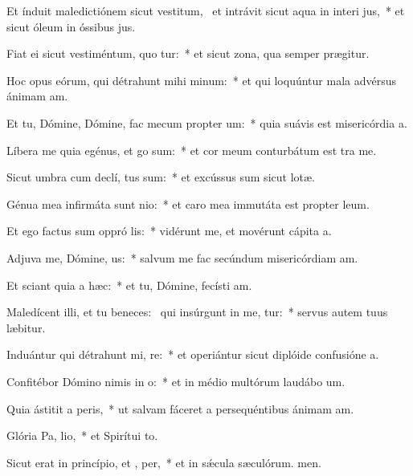 \item Et índuit maledictiónem sicut vestitum,~\pscross{} et intrávit sicut aqua in interi jus,~* et sicut óleum in óssibus jus.
\item Fiat ei sicut vestiméntum, quo tur:~* et sicut zona, qua semper prægitur.
\item Hoc opus eórum, qui détrahunt mihi  minum:~* et qui loquúntur mala advérsus ánimam am.
\item Et tu, Dómine, Dómine, fac mecum propter  um:~* quia suávis est misericórdia a.
\item Líbera me quia egénus, et  go sum:~* et cor meum conturbátum est tra me.
\item Sicut umbra cum declí, tus sum:~* et excússus sum sicut lotæ.
\item Génua mea infirmáta sunt  nio:~* et caro mea immutáta est propter leum.
\item Et ego factus sum oppró lis:~* vidérunt me, et movérunt cápita a.
\item Adjuva me, Dómine,  us:~* salvum me fac secúndum misericórdiam am.
\item Et sciant quia  a hæc:~* et tu, Dómine, fecísti am.
\item Maledícent illi, et tu beneces:~\pscross{} qui insúrgunt in me, tur:~* servus autem tuus læbitur.
\item Induántur qui détrahunt mi, re:~* et operiántur sicut diplóide confusióne a.
\item Confitébor Dómino nimis in  o:~* et in médio multórum laudábo um.
\item Quia ástitit a  peris,~* ut salvam fáceret a persequéntibus ánimam am.
\item Glória Pa,  lio,~* et Spirítui to.
\item Sicut erat in princípio, et ,  per,~* et in sǽcula sæculórum. men.
